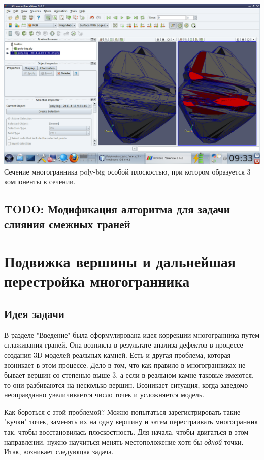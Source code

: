 \documentclass[a4paper,12pt, titlepage]{article}
\begin{document}
	\begin{flushleft}
		\includegraphics[trim = 350 65 10 140, clip, width=15cm]{poly-big/3components.png}
		Сечение многогранника poly-big особой плоскостью, при котором образуется 3 компоненты в 
		сечении.
	\end{flushleft}

\subsection{TODO: Модификация алгоритма для задачи слияния смежных граней}


\section{Подвижка вершины и дальнейшая перестройка многогранника}
\subsection{Идея задачи}
\begin{flushleft}
 В разделе "Введение" была сформулирована идея коррекции многогранника путем сглаживания граней. Она
возникла в результате анализа дефектов в процессе создания 3D-моделей реальных камней. Есть и другая
проблема, которая возникает в этом процессе. Дело в том, что как правило в многогранниках не бывает вершин
со степенью выше 3, а если в реальном камне таковые имеются, то они разбиваются на несколько вершин. 
Возникает ситуация, когда заведомо неоправданно увеличивается число точек и усложняется модель.
\end{flushleft}

\begin{flushleft}
  Как бороться с этой проблемой? Можно попытаться зарегистрировать такие "кучки" точек, заменять их на одну
вершину и затем перестраивать многогранник так, чтобы восстановилась плоскостность. Для начала, чтобы 
двигаться в этом направлении, нужно научиться менять местоположение хотя бы \textit{одной} точки. Итак,
возникает следующая задача.
\end{flushleft}
\end{document}
